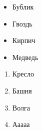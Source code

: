 \documentclass{article}
\begin{document}
\begin{itemize}
\item Бублик
\item Гвоздь
\item Кирпич
\item Медведь
\end{itemize}
\begin{enumerate}
\item Кресло
\item Башня
\item Волга
\item Ааааа
\end{enumerate}
\end{document}

